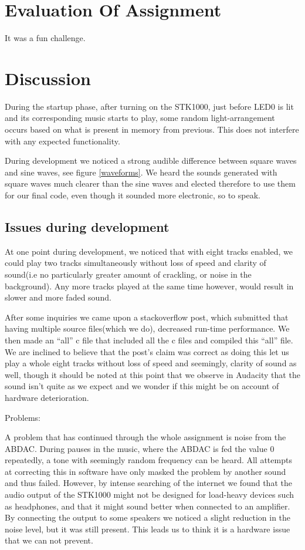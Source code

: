 \documentclass[a4paper,12pt]{article}
\begin{document}
\clearpage
\section{Evaluation Of Assignment}
It was a fun challenge. 
\clearpage
\section{Discussion}

During the startup phase, after turning on the STK1000, just before LED0 is lit and its corresponding music starts to play, some random light-arrangement occurs based on what is present in memory from previous. This does not interfere with any expected functionality.      

During development we noticed a strong audible difference between square waves and sine waves, see figure \ref{waveforms}. We heard the sounds generated with square waves much clearer than the sine waves and elected therefore to use them for our final code, even though it sounded more electronic, so to speak.

\subsection{Issues during development}

At one point during development, we noticed that with eight tracks enabled, we could play two tracks simultaneously without loss of speed and clarity of sound(i.e no particularly greater amount of crackling, or noise in the background). Any more tracks played at the same time however, would result in slower and more faded sound.

After some inquiries we came upon a stackoverflow post\cite{multifile}, which submitted that having multiple source files(which we do), decreased run-time performance. We then made an “all” c file that included all the c files and compiled this “all” file. We are inclined to believe that the post’s claim was correct as doing this let us play a whole eight tracks without loss of speed and seemingly, clarity of sound as well, though it should be noted at this point that we observe in Audacity that the sound isn’t quite as we expect and we wonder if this might be on account of hardware deterioration.

Problems:

A problem that has continued through the whole assignment is noise from the ABDAC. During pauses in the music, where the ABDAC is fed the value 0 repeatedly, a tone with seemingly random frequency can be heard. All attempts at correcting this in software have only masked the problem by another sound and thus failed. However, by intense searching of the internet we found that the audio output of the STK1000 might not be designed for load-heavy devices such as headphones, and that it might sound better when connected to an amplifier\cite{impedance}. By connecting the output to some speakers we noticed a slight reduction in the noise level, but it was still present. This leads us to think it is a hardware issue that we can not prevent.
\end{document}
